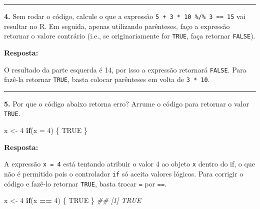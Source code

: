 \documentclass[
]{book}
\newenvironment{Shaded}{\begin{snugshade}}{\end{snugshade}}
\newcommand{\CommentTok}[1]{\textcolor[rgb]{0.56,0.35,0.01}{\textit{#1}}}
\newcommand{\ControlFlowTok}[1]{\textcolor[rgb]{0.13,0.29,0.53}{\textbf{#1}}}
\newcommand{\DataTypeTok}[1]{\textcolor[rgb]{0.13,0.29,0.53}{#1}}
\newcommand{\DecValTok}[1]{\textcolor[rgb]{0.00,0.00,0.81}{#1}}
\newcommand{\NormalTok}[1]{#1}
\newcommand{\OperatorTok}[1]{\textcolor[rgb]{0.81,0.36,0.00}{\textbf{#1}}}
\newcommand{\OtherTok}[1]{\textcolor[rgb]{0.56,0.35,0.01}{#1}}
\newcommand{\StringTok}[1]{\textcolor[rgb]{0.31,0.60,0.02}{#1}}
\begin{document}
\begin{center}\rule{0.5\linewidth}{0.5pt}\end{center}

\textbf{4.} Sem rodar o código, calcule o que a expressão \texttt{5\ +\ 3\ *\ 10\ \%/\%\ 3\ ==\ 15} vai resultar no R. Em seguida, apenas utilizando parênteses, faço a expressão retornar o valore contrário (i.e., se originariamente for \texttt{TRUE}, faça retornar \texttt{FALSE}).

\textbf{Resposta:}

O resultado da parte esquerda é 14, por isso a expressão retornará \texttt{FALSE}. Para fazê-la retornar \texttt{TRUE}, basta colocar parênteses em volta de \texttt{3\ *\ 10}.

\begin{Shaded}
\end{Shaded}

\begin{center}\rule{0.5\linewidth}{0.5pt}\end{center}

\textbf{5.} Por que o código abaixo retorna erro? Arrume o código para retornar o valor \texttt{TRUE}.

\begin{Shaded}
\begin{Highlighting}[]
\NormalTok{x <-}\StringTok{ }\DecValTok{4}
\ControlFlowTok{if}\NormalTok{(}\DataTypeTok{x =} \DecValTok{4}\NormalTok{) \{}
  \OtherTok{TRUE}
\NormalTok{\}}
\end{Highlighting}
\end{Shaded}

\textbf{Resposta:}

A expressão \texttt{x\ =\ 4} está tentando atribuir o valor 4 ao objeto \texttt{x} dentro do if, o que não é permitido pois o controlador \texttt{if} só aceita valores lógicos. Para corrigir o código e fazê-lo retornar \texttt{TRUE}, basta trocar \texttt{=} por \texttt{==}.

\begin{Shaded}
\begin{Highlighting}[]
\NormalTok{x <-}\StringTok{ }\DecValTok{4}
\ControlFlowTok{if}\NormalTok{(x }\OperatorTok{==}\StringTok{ }\DecValTok{4}\NormalTok{) \{}
  \OtherTok{TRUE}
\NormalTok{\}}
\CommentTok{## [1] TRUE}
\end{Highlighting}
\end{Shaded}
\end{document}
